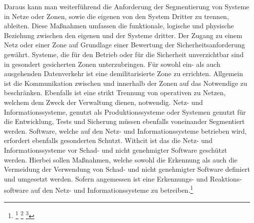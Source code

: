 \documentclass[11pt,a4paper,hidelinks]{article}   %
\begin{document}
\begin{itemize}
            \end{itemize} Daraus kann man weiterführend die Anforderung der Segmentierung von Systeme in Netze oder Zonen, sowie die eigenen von den System Dritter zu trennen, ableiten. Diese Maßnahmen umfassen die funktionale, logische und physische Beziehung zwischen den eigenen und der Systeme dritter. Der Zugang zu einem Netz oder einer Zone auf Grundlage einer Bewertung der Sicherheitsanforderung gewährt. Systeme, die für den Betrieb oder für die Sicherheit unverzichtbar sind in gesondert gesicherten Zonen unterzubringen. Für sowohl ein- als auch ausgehenden Datenverkehr ist eine demilitarisierte Zone zu errichten. Allgemein ist die Kommunikation zwischen und innerhalb der Zonen auf das Notwendige zu beschränken. Ebenfalls ist eine strikt Trennung von operativen zu Netzen, welchem dem Zweck der Verwaltung dienen, notwendig. Netz- und Informationssysteme, genutzt als Produktionssysteme oder Systemen genutzt für die Entwicklung, Tests und Sicherung müssen ebenfalls voneinander Segmentiert werden. Software, welche auf den Netz- und Informationssysteme betrieben wird, erfordert ebenfalls gesonderten Schutzt. Withcit ist das die Netz- und Informationssysteme vor Schad- und nicht genehmigter Software geschützt werden. Hierbei sollen Maßnahmen, welche sowohl die Erkennung als auch die Vermeidung der Verwendung von Schad- und nicht genehmigter Software definiert und umgesetzt werden. Sofern angemessen ist eine Erkennungs- und Reaktions­software auf den Netz- und Informationssysteme zu betreiben.\footnote{
                \footcite[Vgl. Nummer 6.7, 6.8 \& 6.9,][, Anhang]{EU2024-2690}
                \footcite[Vgl. §31 Absatz 2,][]{NIS2UmsuCG} %
                \footcite[Vgl. §53 Absatz 1,][]{NIS2UmsuCG} %
            }
            
\end{document}

